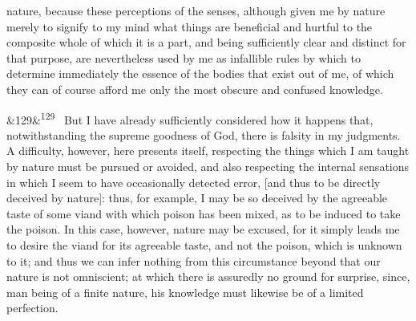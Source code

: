 \documentclass[12pt]{article}
\newcommand{\para}[1][]{\par\noindent\ifx&#1&\else\textsuperscript{\footnotesize #1}~\fi}
\begin{document}
nature, because these perceptions of the senses, although given me by nature merely to signify to my mind what things are beneficial and hurtful to the composite whole of which it is a part, and being sufficiently clear and distinct for that purpose, are nevertheless used by me as infallible rules by which to determine immediately the essence of the bodies that exist out of me, of which they can of course afford me only the most obscure and confused knowledge.

\para[129] But I have already sufficiently considered how it happens that, notwithstanding the supreme goodness of God, there is falsity in my judgments. A difficulty, however, here presents itself, respecting the things which I am taught by nature must be pursued or avoided, and also respecting the internal sensations in which I seem to have occasionally detected error, [and thus to be directly deceived by nature]: thus, for example, I may be so deceived by the agreeable taste of some viand with which poison has been mixed, as to be induced to take the poison. In this case, however, nature may be excused, for it simply leads me to desire the viand for its agreeable taste, and not the poison, which is unknown to it; and thus we can infer nothing from this circumstance beyond that our nature is not omniscient; at which there is assuredly no ground for surprise, since, man being of a finite nature, his knowledge must likewise be of a limited perfection.
\end{document}
